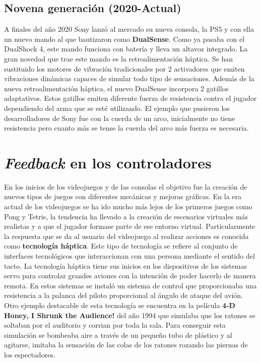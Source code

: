 \subsection{Novena generaci\'on (2020-Actual)}

A finales del a\~no 2020 Sony lanz\'o al mercado su nueva consola, la PS5 y con ella un nuevo mando al que bautizaron como \textbf{DualSense}. Como ya pasaba con el DualShock 4, este mando funciona con bater\'ia y lleva un altavoz integrado. La gran novedad que trae este mando es la retroalimentaci\'on h\'aptica. Se han sustituido los motores de vibraci\'on tradicionales por 2 activadores que emiten vibraciones din\'amicas capaces de simular todo tipo de sensaciones. Adem\'as de la nueva retroalimentaci\'on h\'aptica, el nuevo DualSense incorpora 2 gatillos adaptativos. Estos gatillos emiten diferente fuerza de resistencia contra el jugador dependiendo del arma que se est\'e utilizando. El ejemplo que pusieron los desarrolladores de Sony fue con la cuerda de un arco, inicialmente no tiene resistencia pero cuanto m\'as se tense la cuerda del arco m\'as fuerza es necesaria.

\section{\textit{Feedback} en los controladores}

En los inicios de los videojuegos y de las consolas el objetivo fue la creaci\'on de nuevos tipos de juegos con diferentes mec\'anicas y mejoras gr\'aficas. En la era actual de los videojuegos se ha ido mucho m\'as lejos de los primeros juegos como Pong y Tetris, la tendencia ha llevado a la creaci\'on de escenarios virtuales m\'as realistas y a que el jugador formase parte de ese entorno virtual. Particularmente la respuesta que se da al usuario del videojuego al realizar acciones es conocida como \textbf{tecnolog\'ia h\'aptica}. Este tipo de tecnolog\'ia se refiere al conjunto de interfaces tecnol\'ogicos que interaccionan con una persona mediante el sentido del tacto. La tecnolog\'ia h\'aptica tiene sus inicios en los dispositivos de los sistemas servo para controlar grandes aviones con la intenci\'on de poder hacerlo de manera remota. En estos sistemas se instal\'o un sistema de control que proporcionaba una resistencia a la palanca del piloto proporcional al \'angulo de ataque del avi\'on. Otro ejemplo destacable de esta tecnolog\'ia se encuentra en la pel\'icula \textbf{4-D Honey, I Shrunk the Audience!} del a\~no 1994 que simulaba que los ratones se soltaban por el auditorio y corrian por toda la sala. Para conseguir esta simulaci\'on se bombeaba aire a trav\'es de un peque\~no tubo de pl\'astico y al agitarse, imitaba la sensaci\'on de las colas de los ratones rozando las piernas de los espectadores. \\

